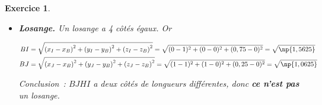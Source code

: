 \documentclass[10pt]{article}
\newtheorem{exo}{Exercice}
\begin{document}
\begin{exo}
\begin{enumerate}
\begin{itemize}
\begin{align*}&\overrightarrow{BJ}\begin{pmatrix} x_J-x_B\\y_J-y_B\\z_J-z_B \end{pmatrix}\qquad 
\overrightarrow{BJ}\begin{pmatrix} 1-1\\1-0\\0,25-0\end{pmatrix}\qquad \overrightarrow{BJ}\begin{pmatrix} 0
\\1\\0,25 \end{pmatrix}\\
&\overrightarrow{IH}\begin{pmatrix} x_H-x_I\\y_H-y_I\\z_H-z_I \end{pmatrix}\qquad 
\overrightarrow{IH}\begin{pmatrix} 0-0\\1-0\\1-0,75\end{pmatrix}\qquad \overrightarrow{IH}\begin{pmatrix} 0
\\1\\0,25 \end{pmatrix}
\end{align*}

\medskip

Conclusion~: $\overrightarrow{BJ}=\overrightarrow{IH},$ donc $BJHI$ est un parallélogramme.

\medskip

\danger La colinéarité des vecteurs ne suffit pas, il doivent être \textbf{égaux}.

\item[\textbullet] \textbf{Losange.} Un losange a 4 côtés égaux. Or 

\begin{align*}
BI&=\sqrt{\left(x_I-x_B\right)^2+\left(y_I-y_B\right)^2+\left(z_I-z_B\right)^2}=\sqrt{(0-1)^2+(0-0)^2+(0,75-0)^2}=\sqrt{\np{1,5625}}\\
BJ&=\sqrt{\left(x_J-x_B\right)^2+\left(y_J-y_B\right)^2+\left(z_J-z_B\right)^2}=\sqrt{(1-1)^2+(1-0)^2+(0,25-0)^2}=\sqrt{\np{1,0625}}
\end{align*}

\medskip

Conclusion~:  $BJHI$ a deux côtés de longueurs différentes, donc \textbf{ce n'est pas} un losange.
\end{itemize}
\end{enumerate}



\end{exo}
\end{document}
